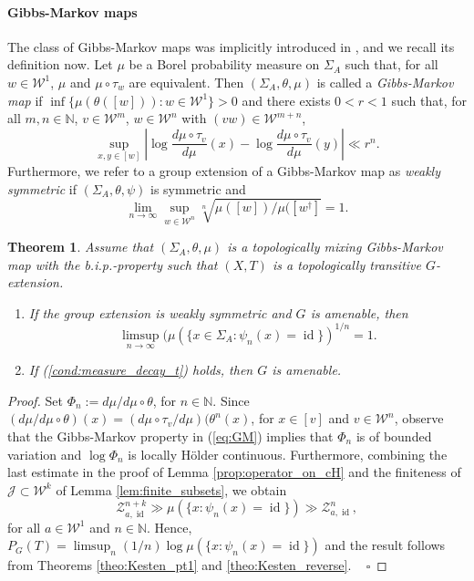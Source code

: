 \documentclass[10pt]{article}
\newtheorem{theorem}{Theorem}[section]
\theoremstyle{mystyle}
\newcommand{\N}{\mathbb{N}}
\newcommand{\cZ}{\mathcal{Z}}
\newcommand{\cW}{\mathcal{W}}
\newcommand{\te}{{\theta}}
\newcommand{\Sig}{{\Sigma}}
\newcommand{\1}{\mathbf{1}}
\newcommand{\with}{:}
\DeclareMathOperator{\id}{id}
\begin{document}
\paragraph{Gibbs-Markov maps} The class of Gibbs-Markov maps was implicitly introduced in \cite{AaronsonDenkerUrbanski:1993}, and we recall its  definition now. Let $\mu$ be a Borel probability measure on $\Sig_A$ such that, for all $w \in \cW^1$, $\mu$ and $\mu \circ \tau_w$ are equivalent. Then $(\Sig_A,\te, \mu)$ is called  a \emph{Gibbs-Markov map} if 
$\inf \{\mu(\te([w]))\with w \in \cW^1\} >0$ and 
there exists $0<r<1$ such that, 
for all $m,n \in \N$, $v \in \cW^m$, $w \in \cW^n$ with $(vw)\in \cW^{m+n}$,
\begin{equation} \label{eq:GM} \sup_{x,y \in [w]} \left|  \log \frac{d\mu \circ \tau_v}{d\mu}(x) -  \log\frac{d\mu \circ \tau_v}{d\mu}(y) \right| \ll r^n. \end{equation}
Furthermore, we refer to a group extension of a Gibbs-Markov map as \emph{weakly symmetric} if $(\Sig_A,\te,\psi)$ is symmetric and  
\[ \lim_{n\to \infty} \sup_{w \in \cW^n} \sqrt[n]{{\mu([w])}/{\mu([w^\dagger]}} = 1.\]
\begin{theorem}
Assume that $(\Sig_A,\te, \mu)$ is a topologically mixing Gibbs-Markov map with the b.i.p.-property such that $(X,T)$ is a topologically transitive $G$-extension.
\begin{enumerate}
\item If the group extension is weakly symmetric and $G$ is amenable, then
\begin{equation} \label{cond:measure_decay_t} \limsup_{n \to \infty} (\mu(\{x \in \Sig_A \with \psi_n(x)=\id \})^{1/n} =1. \end{equation}  
\item If (\ref{cond:measure_decay_t}) holds, then $G$ is amenable.
\end{enumerate} 
\end{theorem}
\begin{proof} Set $\Phi_n := {d\mu} / d\mu\circ\theta$, for $n \in \N$. Since $({d\mu} / d\mu\circ\theta)(x) = ({d\mu\circ \tau_v}/{d\mu})(\theta^n(x)$, for $x \in [v]$ and $v \in \cW^n$, observe that the Gibbs-Markov property in (\ref{eq:GM}) implies that $\Phi_n$ is of bounded variation and $\log \Phi_n$ is locally H\"older continuous. Furthermore, combining the last estimate in the proof of Lemma \ref{prop:operator_on_cH} and the finiteness of  $\mathcal{J}\subset \cW^k$ of Lemma \ref{lem:finite_subsets}, we obtain
\[ \cZ^{n+ k}_{a,\id} \gg \mu(\{x \with \psi_n(x)=\id \})\gg \cZ^n_{a,\id}, \]
for all $a \in \cW^1$ and $n\in \N$. Hence, $P_G(T)= \limsup_{n} (1/n) \log \mu(\{x : \psi_n(x)=\id \})$ and the result follows from Theorems \ref{theo:Kesten_pt1} and \ref{theo:Kesten_reverse}.
~ \hfill $\square$ \end{proof}
\end{document}
